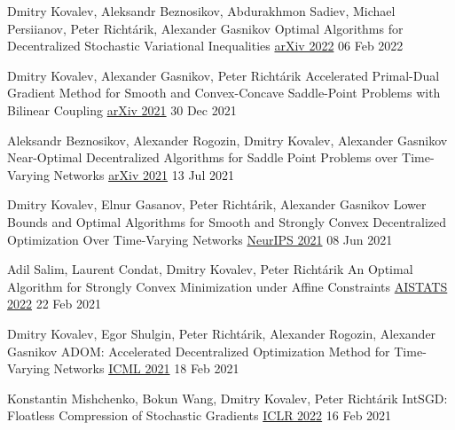 
\begin{cventries}
	

\cventry
{Dmitry Kovalev, Aleksandr Beznosikov, Abdurakhmon Sadiev, Michael Persiianov, Peter Richtárik, Alexander Gasnikov} %
{Optimal Algorithms for Decentralized Stochastic Variational Inequalities} %
{\href{https://arxiv.org/abs/2202.02771}{arXiv 2022}} 
{06 Feb 2022} %
{}	

\cventry
{Dmitry Kovalev, Alexander Gasnikov, Peter Richtárik} %
{Accelerated Primal-Dual Gradient Method for Smooth and Convex-Concave Saddle-Point Problems with Bilinear Coupling} %
{\href{https://arxiv.org/abs/2112.15199}{arXiv 2021}} 
{30 Dec 2021} %
{}	

\cventry
{Aleksandr Beznosikov, Alexander Rogozin, Dmitry Kovalev, Alexander Gasnikov} %
{Near-Optimal Decentralized Algorithms for Saddle Point Problems over Time-Varying Networks} %
{\href{https://arxiv.org/abs/2107.05957}{arXiv 2021}} 
{13 Jul 2021} %
{}	

\cventry
{Dmitry Kovalev, Elnur Gasanov, Peter Richtárik, Alexander Gasnikov} %
{Lower Bounds and Optimal Algorithms for Smooth and Strongly Convex Decentralized Optimization Over Time-Varying Networks} %
{\href{https://proceedings.neurips.cc/paper/2021/hash/bc37e109d92bdc1ea71da6c919d54907-Abstract.html}{NeurIPS 2021}} 
{08 Jun 2021} %
{}	

\cventry
{Adil Salim, Laurent Condat, Dmitry Kovalev, Peter Richtárik} %
{An Optimal Algorithm for Strongly Convex Minimization under Affine Constraints} %
{\href{http://aistats.org/aistats2022/accepted.html}{AISTATS 2022}}
{22 Feb 2021} %
{}	

\cventry
{Dmitry Kovalev, Egor Shulgin, Peter Richtárik, Alexander Rogozin, Alexander Gasnikov} %
{ADOM: Accelerated Decentralized Optimization Method for Time-Varying Networks} %
{\href{http://proceedings.mlr.press/v139/kovalev21a}{ICML 2021}} 
{18 Feb 2021} %
{}	

\cventry
{Konstantin Mishchenko, Bokun Wang, Dmitry Kovalev, Peter Richtárik} %
{IntSGD: Floatless Compression of Stochastic Gradients} %
{\href{https://openreview.net/forum?id=pFyXqxChZc}{ICLR 2022}}
{16 Feb 2021} %
{}	


\end{cventries}
